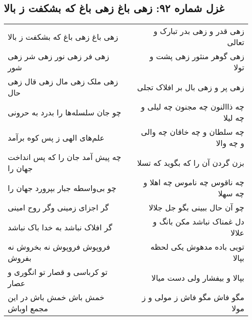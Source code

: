 \begin{center}
\section*{غزل شماره ۹۲: زهی باغ زهی باغ که بشکفت ز بالا}
\label{sec:0092}
\begin{longtable}{l p{0.5cm} r}
زهی باغ زهی باغ که بشکفت ز بالا
&&
زهی قدر و زهی بدر تبارک و تعالی
\\
زهی فر زهی نور زهی شر زهی شور
&&
زهی گوهر منثور زهی پشت و تولا
\\
زهی ملک زهی مال زهی قال زهی حال
&&
زهی پر و زهی بال بر افلاک تجلی
\\
چو جان سلسله‌ها را بدرد به حرونی
&&
چه ذاالنون چه مجنون چه لیلی و چه لیلا
\\
علم‌های الهی ز پس کوه برآمد
&&
چه سلطان و چه خاقان چه والی و چه والا
\\
چه پیش آمد جان را که پس انداخت جهان را
&&
بزن گردن آن را که بگوید که تسلا
\\
چو بی‌واسطه جبار بپرورد جهان را
&&
چه ناقوس چه ناموس چه اهلا و چه سهلا
\\
گر اجزای زمینی وگر روح امینی
&&
چو آن حال ببینی بگو جل جلالا
\\
گر افلاک نباشد به خدا باک نباشد
&&
دل غمناک نباشد مکن بانگ و علالا
\\
فروپوش فروپوش نه بخروش نه بفروش
&&
تویی باده مدهوش یکی لحظه بپالا
\\
تو کرباسی و قصار تو انگوری و عصار
&&
بپالا و بیفشار ولی دست میالا
\\
خمش باش خمش باش در این مجمع اوباش
&&
مگو فاش مگو فاش ز مولی و ز مولا
\\
\end{longtable}
\end{center}
